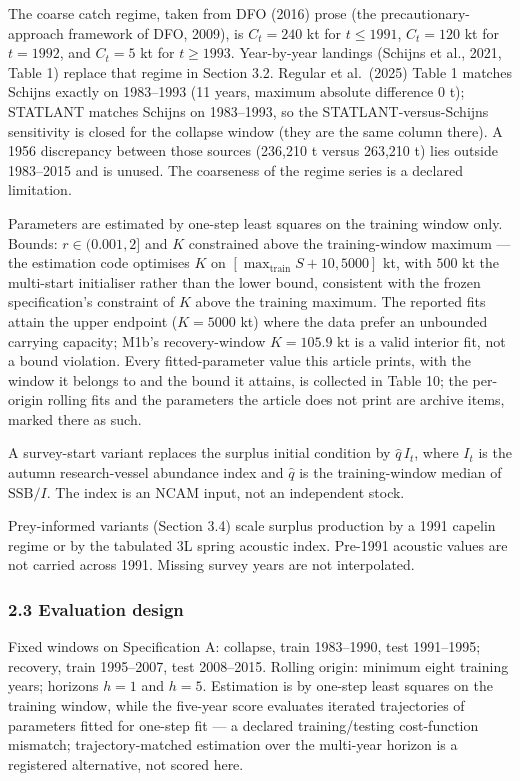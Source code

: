 \documentclass[11pt]{article}
\begin{document}
The coarse catch regime, taken from DFO (2016) prose (the
precautionary-approach framework of DFO, 2009), is \(C_t=240\) kt for
\(t\le 1991\), \(C_t=120\) kt for \(t=1992\), and \(C_t=5\) kt for
\(t\ge 1993\). Year-by-year landings (Schijns et al., 2021, Table 1)
replace that regime in Section 3.2. Regular et al.~(2025) Table 1
matches Schijns exactly on 1983--1993 (11 years, maximum absolute
difference 0 t); STATLANT matches Schijns on 1983--1993, so the
STATLANT-versus-Schijns sensitivity is closed for the collapse window
(they are the same column there). A 1956 discrepancy between those
sources (236,210 t versus 263,210 t) lies outside 1983--2015 and is
unused. The coarseness of the regime series is a declared limitation.

Parameters are estimated by one-step least squares on the training
window only. Bounds: \(r\in(0.001,2]\) and \(K\) constrained above the
training-window maximum --- the estimation code optimises \(K\) on
\([\max_{\mathrm{train}} S + 10, 5000]\) kt, with \(500\) kt the
multi-start initialiser rather than the lower bound, consistent with the
frozen specification's constraint of \(K\) above the training maximum.
The reported fits attain the upper endpoint (\(K = 5000\) kt) where the
data prefer an unbounded carrying capacity; M1b's recovery-window
\(K = 105.9\) kt is a valid interior fit, not a bound violation. Every
fitted-parameter value this article prints, with the window it belongs
to and the bound it attains, is collected in Table 10; the per-origin
rolling fits and the parameters the article does not print are archive
items, marked there as such.

A survey-start variant replaces the surplus initial condition by
\(\hat q\,I_t\), where \(I_t\) is the autumn research-vessel abundance
index and \(\hat q\) is the training-window median of
\(\mathrm{SSB}/I\). The index is an NCAM input, not an independent
stock.

Prey-informed variants (Section 3.4) scale surplus production by a 1991
capelin regime or by the tabulated 3L spring acoustic index. Pre-1991
acoustic values are not carried across 1991. Missing survey years are
not interpolated.

\subsubsection{2.3 Evaluation design}\label{evaluation-design}

Fixed windows on Specification A: collapse, train 1983--1990, test
1991--1995; recovery, train 1995--2007, test 2008--2015. Rolling origin:
minimum eight training years; horizons \(h=1\) and \(h=5\). Estimation
is by one-step least squares on the training window, while the five-year
score evaluates iterated trajectories of parameters fitted for one-step
fit --- a declared training/testing cost-function mismatch;
trajectory-matched estimation over the multi-year horizon is a
registered alternative, not scored here.
\end{document}
